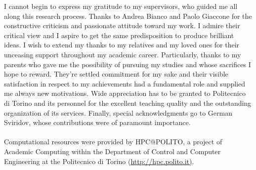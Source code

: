 \ringraziamenti
I cannot begin to express my gratitude to my supervisors, who guided me all along this research process. Thanks to Andrea Bianco and Paolo Giaccone for the constructive criticism and passionate attitude toward my work. I admire their critical view and I aspire to get the same predisposition to produce brilliant ideas. I wish to extend my thanks to my relatives and my loved ones for their unceasing support throughout my academic career. Particularly, thanks to my parents who gave me the possibility of pursuing my studies and whose sacrifices I hope to reward.  They're settled commitment for my sake and their visible satisfaction in respect to my achievements had a fundamental role and supplied me always new motivations.
Wide appreciation has to be granted to Politecnico di Torino and its personnel for the excellent teaching quality and the outstanding organization of its services. Finally, special acknowledgments go to German Sviridov, whose contributions were of paramount importance.
\\\\
Computational resources were provided by HPC@POLITO, a project of Academic Computing within the Department of Control and Computer 
Engineering at the Politecnico di Torino (\url{http://hpc.polito.it)}.